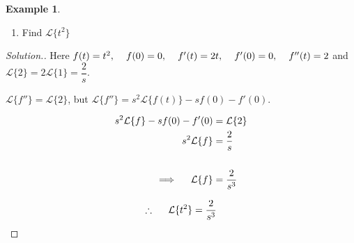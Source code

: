 \documentclass[11pt,a4paper]{article}
\theoremstyle{definition}
\newtheorem{exa}[thm]{Example}
\newenvironment{solution}
  {\renewcommand{\qedsymbol}{}\begin{proof}[\textit{Solution}.]}
  {\end{proof}}
\begin{document}
\begin{exa}
\begin{enumerate}
\item Find $\displaystyle{\mathcal{L}\{t^2\}}$
\end{enumerate}
\end{exa}

\begin{solution}
Here $f(t) =t^2,\hspace{0.4cm} f(0) = 0, \hspace{0.4cm} f'(t) = 2t,\hspace{0.4cm} f'(0) = 0,\hspace{0.4cm} f''(t) =2$ and $\mathcal{L}\{2\} =2\mathcal{L}\{1\} = \dfrac{2}{s}$.

$\mathcal{L}\{f''\} = \mathcal{L}\{2\}$, but $\mathcal{L}\{f''\} =s^2\mathcal{L}\{f(t)\} - sf(0) - f'(0)$.

\begin{align*}
s^2\mathcal{L}\{f\} - s f(0) - f'(0) & = \mathcal{L}\{2\}\\
s^2 \mathcal{L}\{f\} & = \frac{2}{s}\\\\
\implies\hspace{0.4cm} \mathcal{L}\{f\} & = \frac{2}{s^3}
\end{align*}

$$\therefore\hspace{0.5cm} \mathcal{L}\{t^2\} = \frac{2}{s^3}$$
\end{solution}
\end{document}
